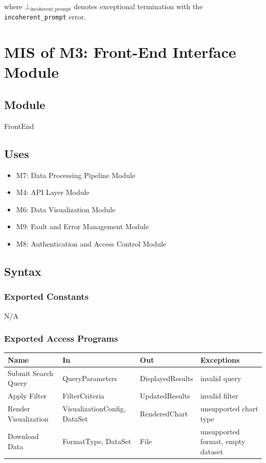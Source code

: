 \documentclass[12pt, titlepage]{article}
\begin{document}
where $\bot_{\text{incoherent\_prompt}}$ denotes exceptional termination with the \texttt{incoherent\_prompt} error.


\section{MIS of M3: Front-End Interface Module} \label{Module 3}

\subsection{Module}

FrontEnd

\subsection{Uses}

\begin{itemize}
    \item M7: Data Processing Pipeline Module
    \item M4: API Layer Module
    \item M6: Data Visualization Module
    \item M9: Fault and Error Management Module
    \item M8: Authentication and Access Control Module
\end{itemize}

\subsection{Syntax}

\subsubsection{Exported Constants}

\par{N/A}

\subsubsection{Exported Access Programs}

\begin{center}
\begin{tabularx}{\textwidth}{X X l X}
\hline
\textbf{Name} & \textbf{In} & \textbf{Out} & \textbf{Exceptions} \\
\hline
Submit Search Query & QueryParameters & DisplayedResults & invalid query \\
Apply Filter & FilterCriteria & UpdatedResults & invalid filter \\
Render Visualization & VisualizationConfig, DataSet & RenderedChart & unsupported chart type \\
Download Data & FormatType, DataSet & File & unsupported format, empty dataset \\
\hline
\end{tabularx}
\end{center}
\end{document}
